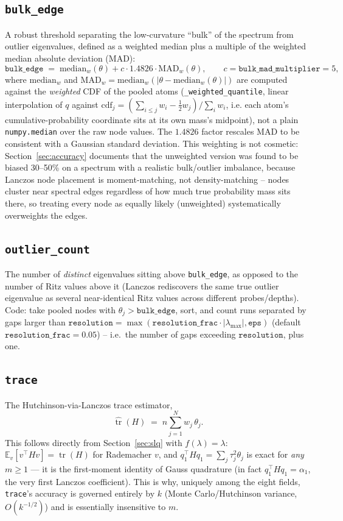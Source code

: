 \documentclass[11pt]{article}
\newcommand{\code}[1]{\texttt{#1}}
\begin{document}
\subsection{\code{bulk_edge}}
A robust threshold separating the low-curvature ``bulk'' of the spectrum
from outlier eigenvalues, defined as a weighted median plus a multiple of
the weighted median absolute deviation (MAD):
\[
\code{bulk_edge} \;=\; \mathrm{median}_w(\theta) + c\cdot 1.4826\cdot
\mathrm{MAD}_w(\theta), \qquad c = \code{bulk_mad_multiplier} = 5,
\]
where \(\mathrm{median}_w\) and \(\mathrm{MAD}_w = \mathrm{median}_w(|\theta -
\mathrm{median}_w(\theta)|)\) are computed against the \emph{weighted} CDF
of the pooled atoms (\code{_weighted_quantile}, linear interpolation of
\(q\) against \(\mathrm{cdf}_j = (\sum_{i\le j} w_i - \tfrac12 w_j)/\sum_i
w_i\), i.e. each atom's cumulative-probability coordinate sits at its own
mass's midpoint), not a plain \code{numpy.median} over the raw node values.
The \(1.4826\) factor rescales MAD to be consistent with a Gaussian
standard deviation. This weighting is not cosmetic: Section~\ref{sec:accuracy}
documents that the unweighted version was found to be biased 30--50\% on a
spectrum with a realistic bulk/outlier imbalance, because Lanczos node
placement is moment-matching, not density-matching -- nodes cluster near
spectral edges regardless of how much true probability mass sits there, so
treating every node as equally likely (unweighted) systematically
overweights the edges.

\subsection{\code{outlier_count}}
The number of \emph{distinct} eigenvalues sitting above \code{bulk_edge},
as opposed to the number of Ritz values above it (Lanczos rediscovers the
same true outlier eigenvalue as several near-identical Ritz values across
different probes/depths). Code: take pooled nodes with \(\theta_j >
\code{bulk_edge}\), sort, and count runs separated by gaps larger than
\(\code{resolution} = \max(\code{resolution_frac}\cdot|\lambda_{\max}|,
\code{eps})\) (default \(\code{resolution_frac}=0.05\)) -- i.e.\ the number
of gaps exceeding \(\code{resolution}\), plus one.

\subsection{\code{trace}}
\label{sec:trace}
The Hutchinson-via-Lanczos trace estimator,
\[
\widehat{\operatorname{tr}}(H) \;=\; n\sum_{j=1}^N w_j\,\theta_j.
\]
This follows directly from Section~\ref{sec:slq} with \(f(\lambda) =
\lambda\): \(\mathbb{E}_v[v^\top H v] = \operatorname{tr}(H)\) for Rademacher
\(v\), and \(q_1^\top H q_1 = \sum_j \tau_j^2 \theta_j\) is exact for
\emph{any} \(m \ge 1\) --- it is the first-moment identity of Gauss
quadrature (in fact \(q_1^\top H q_1 = \alpha_1\), the very first Lanczos
coefficient). This is why, uniquely among the eight fields,
\code{trace}'s accuracy is governed entirely by \(k\) (Monte Carlo/Hutchinson
variance, \(O(k^{-1/2})\)) and is essentially insensitive to \(m\).
\end{document}
